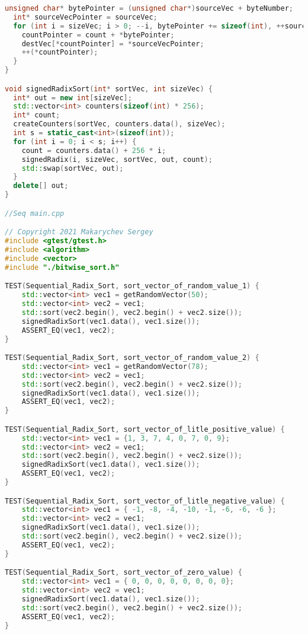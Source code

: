\documentclass{report}
\begin{document}
\begin{lstlisting}[language=C++]
  unsigned char* bytePointer = (unsigned char*)sourceVec + byteNumber;
  int* sourceVecPointer = sourceVec;
  for (int i = sizeVec; i > 0; --i, bytePointer += sizeof(int), ++sourceVecPointer) {
    countPointer = count + *bytePointer;
    destVec[*countPointer] = *sourceVecPointer;
    ++(*countPointer);
  }
}

void signedRadixSort(int* sortVec, int sizeVec) {
  int* out = new int[sizeVec];
  std::vector<int> counters(sizeof(int) * 256);
  int* count;
  createCounters(sortVec, counters.data(), sizeVec);
  int s = static_cast<int>(sizeof(int));
  for (int i = 0; i < s; i++) {
    count = counters.data() + 256 * i;
    signedRadix(i, sizeVec, sortVec, out, count);
    std::swap(sortVec, out);
  }
  delete[] out;
}

//Seq main.cpp

// Copyright 2021 Makarychev Sergey
#include <gtest/gtest.h>
#include <algorithm>
#include <vector>
#include "./bitwise_sort.h"

TEST(Sequential_Radix_Sort, sort_vector_of_random_value_1) {
    std::vector<int> vec1 = getRandomVector(50);
    std::vector<int> vec2 = vec1;
    std::sort(vec2.begin(), vec2.begin() + vec2.size());
    signedRadixSort(vec1.data(), vec1.size());
    ASSERT_EQ(vec1, vec2);
}

TEST(Sequential_Radix_Sort, sort_vector_of_random_value_2) {
    std::vector<int> vec1 = getRandomVector(78);
    std::vector<int> vec2 = vec1;
    std::sort(vec2.begin(), vec2.begin() + vec2.size());
    signedRadixSort(vec1.data(), vec1.size());
    ASSERT_EQ(vec1, vec2);
}

TEST(Sequential_Radix_Sort, sort_vector_of_litle_positive_value) {
    std::vector<int> vec1 = {1, 3, 7, 4, 0, 7, 0, 9};
    std::vector<int> vec2 = vec1;
    std::sort(vec2.begin(), vec2.begin() + vec2.size());
    signedRadixSort(vec1.data(), vec1.size());
    ASSERT_EQ(vec1, vec2);
}

TEST(Sequential_Radix_Sort, sort_vector_of_litle_negative_value) {
    std::vector<int> vec1 = { -1, -8, -4, -10, -1, -6, -6, -6 };
    std::vector<int> vec2 = vec1;
    signedRadixSort(vec1.data(), vec1.size());
    std::sort(vec2.begin(), vec2.begin() + vec2.size());
    ASSERT_EQ(vec1, vec2);
}

TEST(Sequential_Radix_Sort, sort_vector_of_zero_value) {
    std::vector<int> vec1 = { 0, 0, 0, 0, 0, 0, 0, 0};
    std::vector<int> vec2 = vec1;
    signedRadixSort(vec1.data(), vec1.size());
    std::sort(vec2.begin(), vec2.begin() + vec2.size());
    ASSERT_EQ(vec1, vec2);
}


\end{lstlisting}
\end{document}
